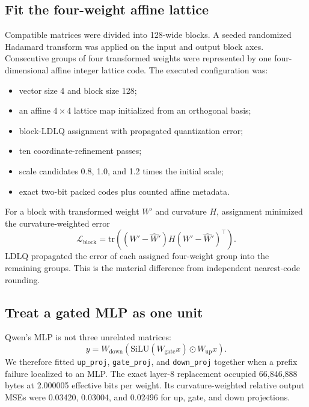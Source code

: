 \documentclass[10pt,twocolumn]{article}
\newcommand{\code}[1]{\texttt{#1}}
\begin{document}
\subsection{Fit the four-weight affine lattice}

Compatible matrices were divided into 128-wide blocks. A seeded randomized Hadamard transform was applied on the input and output block axes. Consecutive groups of four transformed weights were represented by one four-dimensional affine integer lattice code. The executed configuration was:

\begin{itemize}
\item vector size 4 and block size 128;
\item an affine $4\times4$ lattice map initialized from an orthogonal basis;
\item block-LDLQ assignment with propagated quantization error;
\item ten coordinate-refinement passes;
\item scale candidates 0.8, 1.0, and 1.2 times the initial scale;
\item exact two-bit packed codes plus counted affine metadata.
\end{itemize}

For a block with transformed weight $W'$ and curvature $H$, assignment minimized the curvature-weighted error
\begin{equation}
\mathcal{L}_{\mathrm{block}} = \mathrm{tr}\!\left((W'-\widehat W')H(W'-\widehat W')^\top\right).
\end{equation}
LDLQ propagated the error of each assigned four-weight group into the remaining groups. This is the material difference from independent nearest-code rounding.

\subsection{Treat a gated MLP as one unit}

Qwen's MLP is not three unrelated matrices:
\begin{equation}
y = W_{\mathrm{down}}\left(\mathrm{SiLU}(W_{\mathrm{gate}}x)\odot W_{\mathrm{up}}x\right).
\end{equation}
We therefore fitted \code{up\_proj}, \code{gate\_proj}, and \code{down\_proj} together when a prefix failure localized to an MLP. The exact layer-8 replacement occupied 66,846,888 bytes at 2.000005 effective bits per weight. Its curvature-weighted relative output MSEs were 0.03420, 0.03004, and 0.02496 for up, gate, and down projections.
\end{document}
